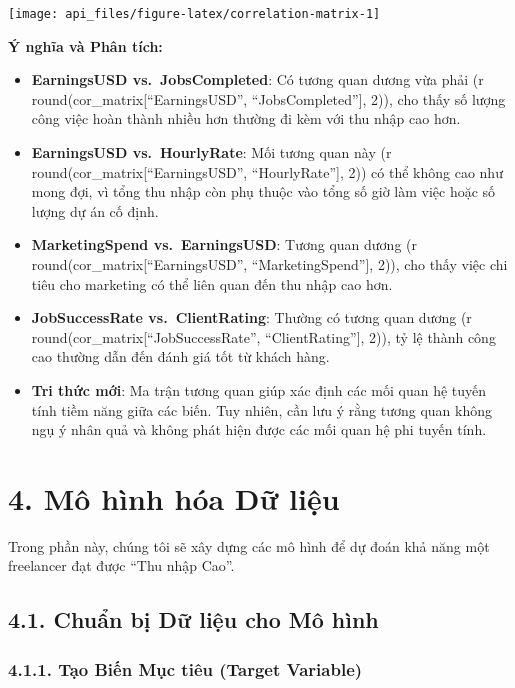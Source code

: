 \documentclass[
]{article}
\begin{document}
\begin{center}\texttt{[image: api\_files/figure-latex/correlation-matrix-1]} \end{center}

\textbf{Ý nghĩa và Phân tích:}

\begin{itemize}
\item
  \textbf{EarningsUSD vs.~JobsCompleted}: Có tương quan dương vừa phải
  (r round(cor\_matrix{[}``EarningsUSD'', ``JobsCompleted''{]}, 2)), cho
  thấy số lượng công việc hoàn thành nhiều hơn thường đi kèm với thu
  nhập cao hơn.
\item
  \textbf{EarningsUSD vs.~HourlyRate}: Mối tương quan này (r
  round(cor\_matrix{[}``EarningsUSD'', ``HourlyRate''{]}, 2)) có thể
  không cao như mong đợi, vì tổng thu nhập còn phụ thuộc vào tổng số giờ
  làm việc hoặc số lượng dự án cố định.
\item
  \textbf{MarketingSpend vs.~EarningsUSD}: Tương quan dương (r
  round(cor\_matrix{[}``EarningsUSD'', ``MarketingSpend''{]}, 2)), cho
  thấy việc chi tiêu cho marketing có thể liên quan đến thu nhập cao
  hơn.
\item
  \textbf{JobSuccessRate vs.~ClientRating}: Thường có tương quan dương
  (r round(cor\_matrix{[}``JobSuccessRate'', ``ClientRating''{]}, 2)),
  tỷ lệ thành công cao thường dẫn đến đánh giá tốt từ khách hàng.
\item
  \textbf{Tri thức mới}: Ma trận tương quan giúp xác định các mối quan
  hệ tuyến tính tiềm năng giữa các biến. Tuy nhiên, cần lưu ý rằng tương
  quan không ngụ ý nhân quả và không phát hiện được các mối quan hệ phi
  tuyến tính.
\end{itemize}

\section{4. Mô hình hóa Dữ
liệu}\label{muxf4-huxecnh-huxf3a-dux1eef-liux1ec7u}

Trong phần này, chúng tôi sẽ xây dựng các mô hình để dự đoán khả năng
một freelancer đạt được ``Thu nhập Cao''.

\subsection{4.1. Chuẩn bị Dữ liệu cho Mô
hình}\label{chuux1ea9n-bux1ecb-dux1eef-liux1ec7u-cho-muxf4-huxecnh}

\subsubsection{4.1.1. Tạo Biến Mục tiêu (Target
Variable)}\label{tux1ea1o-biux1ebfn-mux1ee5c-tiuxeau-target-variable}
\end{document}
